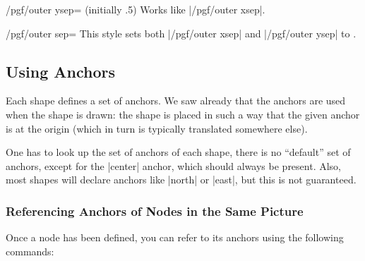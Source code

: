 \begin{key}{/pgf/outer ysep= (initially .5\string\pgflinewidth)}
  Works like |/pgf/outer xsep|.
\end{key}

\begin{key}{/pgf/outer sep=}
  This style sets both |/pgf/outer xsep| and |/pgf/outer ysep| to .
\end{key}



\subsection{Using Anchors}

Each shape defines a set of anchors. We saw already that the anchors
are used when the shape is drawn: the shape is placed in such a way
that the given anchor is at the origin (which in turn is typically
translated somewhere else).

One has to look up the set of anchors of each shape, there is no
``default'' set of anchors, except for the |center| anchor, which
should always be present. Also, most shapes will declare anchors like
|north| or |east|, but this is not guaranteed.


\subsubsection{Referencing Anchors of Nodes in the Same Picture}

Once a node has been defined, you can refer to its anchors using the
following commands:

